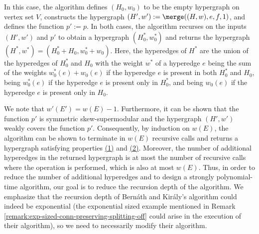 In this case, the algorithm defines $(H_0, w_0)$ to be the empty hypergraph on vertex set $V$, constructs the hypergraph $(H', w'):=\merge((H, w), e, f, 1)$, and defines the function $p' := p$.
In both cases, the algorithm recurses on the inputs $(H',w')$ and $p'$ to obtain a hypergraph $(H^*_0, w^*_0)$ and returns the hypergraph $(H^*, w^*) = (H^*_0 + H_0, w^*_0 + w_0)$. 
Here, the hyperedges of $H^*$ are the union of the hyperedges of $H^*_0$ and $H_0$ with the weight $w^*$ of a hyperedge $e$ being the sum of the weights $w^*_0(e)+w_0(e)$ if the hyperedge $e$ is present in both $H^*_0$ and $H_0$, being $w^*_0(e)$ if the hyperedge $e$ is present only in $H^*_0$, and being $w_0(e)$ if the hyperedge $e$ is present only in $H_0$. 
\fi

 We note that $w'(E') = w(E) - 1$. Furthermore, it can be shown that the function $p'$ is symmetric skew-supermodular and the hypergraph $(H', w')$ weakly covers the function $p'$. Consequently, by induction on $w(E)$, the algorithm can be shown to terminate in $w(E)$ recursive calls and returns a hypergraph satisfying properties \hyperlink{WeakToStrong(1)}{(1)} and \hyperlink{WeakToStrong(2)}{(2)}. Moreover, the number of additional hyperedges in the returned hypergraph is at most the
number of recursive calls where the \merge operation is performed, which is also at most $w(E)$. 
Thus, in order
to reduce the number of additional hyperedges and to design a strongly polynomial-time algorithm, our goal is to
reduce the recursion depth of the algorithm. We emphasize that the recursion depth of Bern\'{a}th and Kir\'{a}ly's algorithm could indeed be exponential (the exponential sized example mentioned in Remark \ref{remark:exp-sized-conn-preserving-splitting-off} could arise in the execution of their algorithm), so we need to necessarily modify their algorithm. 

